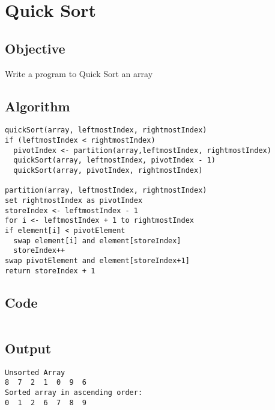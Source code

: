 \section{Quick Sort}
\label{sec:Quick Sort}

\subsection{Objective}
Write a program to Quick Sort an array

\subsection{Algorithm}
\begin{lstlisting}[style=mystyle]
quickSort(array, leftmostIndex, rightmostIndex)
if (leftmostIndex < rightmostIndex)
  pivotIndex <- partition(array,leftmostIndex, rightmostIndex)
  quickSort(array, leftmostIndex, pivotIndex - 1)
  quickSort(array, pivotIndex, rightmostIndex)

partition(array, leftmostIndex, rightmostIndex)
set rightmostIndex as pivotIndex
storeIndex <- leftmostIndex - 1
for i <- leftmostIndex + 1 to rightmostIndex
if element[i] < pivotElement
  swap element[i] and element[storeIndex]
  storeIndex++
swap pivotElement and element[storeIndex+1]
return storeIndex + 1
\end{lstlisting}

\subsection{Code}
\inputminted[]{c}{../../Code/quickSort.c}

\subsection{Output}
\begin{lstlisting}[style=output]
Unsorted Array
8  7  2  1  0  9  6  
Sorted array in ascending order: 
0  1  2  6  7  8  9  
\end{lstlisting}

\pagebreak
